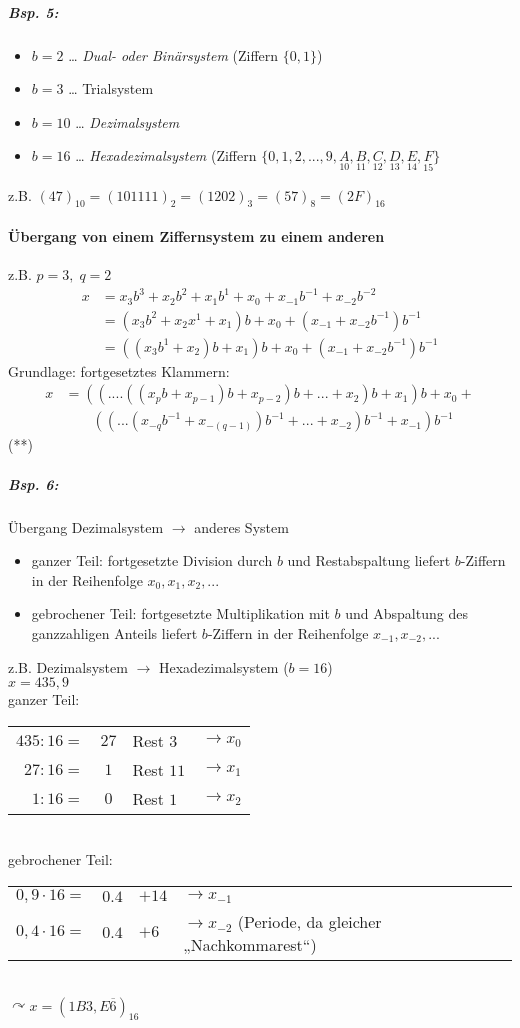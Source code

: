 \subparagraph{Bsp. 5:}
\begin{itemize}
\item $b=2$ … \emph{Dual- oder Binärsystem} (Ziffern $\{0,1\}$)
\item $b=3$ … Trialsystem
\item $b=10$ … \emph{Dezimalsystem}
\item $b=16$ … \emph{Hexadezimalsystem} (Ziffern $\{0,1,2,...,9,\underset{10}{A},\underset{11}{B},\underset{12}{C},\underset{13}{D},\underset{14}{E},\underset{15}{F}\}$
\end{itemize}
z.B. $(47)_{10}=(101111)_2=(1202)_3=(57)_8=(2F)_{16}$
\paragraph{Übergang von einem Ziffernsystem zu einem anderen}\parskp
z.B. $p=3,\; q=2$
\begin{align*}
x&=x_3b^3+x_2b^2+x_1b^1+x_0+x_{-1}b^{-1}+x_{-2}b^{-2}\\
&= (x_3b^2+x_2x^1+x_1)b+x_0+(x_{-1}+x_{-2}b^{-1})b^{-1}\\
&=((x_3b^1+x_2)b+x_1)b+x_0+(x_{-1}+x_{-2}b^{-1})b^{-1}
\end{align*}
Grundlage: fortgesetztes Klammern:
\begin{align*}
x&=((....((x_p b+x_{p-1})b+x_{p-2})b+...+x_2)b+x_1)b+x_0+\\
&\qquad((...(x_{-q}b^{-1}+x_{-(q-1)})b^{-1}+...+x_{-2})b^{-1}+x_{-1})b^{-1}
\end{align*} (**)
\subparagraph{Bsp. 6:} Übergang Dezimalsystem $\rightarrow$ anderes System
\begin{itemize}
\item ganzer Teil: fortgesetzte Division durch $b$ und Restabspaltung liefert $b$-Ziffern in der Reihenfolge $x_0,x_1,x_2,...$
\item gebrochener Teil: fortgesetzte Multiplikation mit $b$ und Abspaltung des ganzzahligen Anteils liefert $b$-Ziffern in der Reihenfolge $x_{-1},x_{-2},...$
\end{itemize}
z.B. Dezimalsystem $\rightarrow$ Hexadezimalsystem ($b=16$)\\
$x=435,9$\\
ganzer Teil:\\
\begin{tabular}{r c l l}
$435:16=$ & $27$ & Rest $3$ &  $\rightarrow x_0$\\
$27:16=$ & $1$ & Rest $11$ &  $\rightarrow x_1$\\
$1:16=$ & $\boxed{0}$ & Rest $1$ &  $\rightarrow x_2$\\
\end{tabular}\\
gebrochener Teil: \\
\begin{tabular}{r c l l}
$0,9 \cdot 16=$ & $0.4$ & $+14$ & $\rightarrow x_{-1}$\\
$0,4 \cdot 16=$ & $\boxed{0.4}$ & $+6$ & $\rightarrow x_{-2}$ (Periode, da gleicher „Nachkommarest“)\\
\end{tabular}\\
$\curvearrowright x=(1B3,E\overline{6})_{16}$

